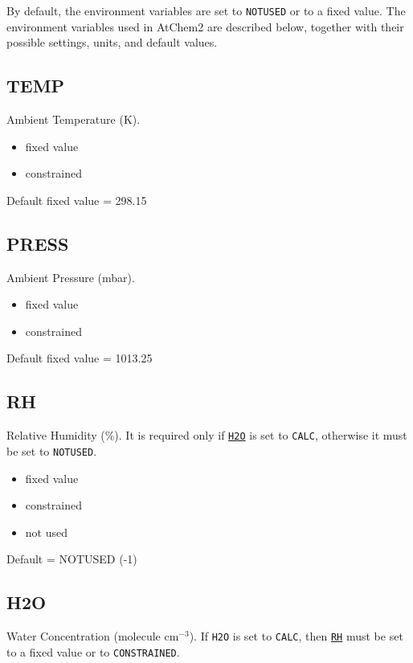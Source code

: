By default, the environment variables are set to \texttt{NOTUSED} or
to a fixed value. The environment variables used in AtChem2 are
described below, together with their possible settings, units, and
default values.

\subsection{TEMP} \label{subsec:temp}

Ambient Temperature (K).

\begin{itemize}
\item fixed value
\item constrained
\end{itemize}

Default fixed value = 298.15

\subsection{PRESS} \label{subsec:press}

Ambient Pressure (mbar).

\begin{itemize}
\item fixed value
\item constrained
\end{itemize}

Default fixed value = 1013.25

\subsection{RH} \label{subsec:rh}

Relative Humidity (\%). It is required only if
\hyperref[subsec:h2o]{\texttt{H2O}} is set to \texttt{CALC}, otherwise
it must be set to \texttt{NOTUSED}.

\begin{itemize}
\item fixed value
\item constrained
\item not used
\end{itemize}

Default = NOTUSED (-1)

\subsection{H2O} \label{subsec:h2o}

Water Concentration (molecule cm$^{-3}$). If \texttt{H2O} is set to
\texttt{CALC}, then \hyperref[subsec:rh]{\texttt{RH}} must be set to a
fixed value or to \texttt{CONSTRAINED}.

